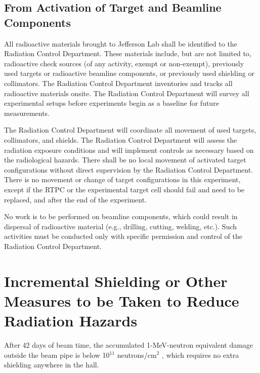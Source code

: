 \documentclass[12pt]{article}
\begin{document}
\subsection{From Activation of Target and Beamline Components}
All radioactive materials brought to Jefferson Lab shall be identified to the
Radiation Control Department. These materials include, but are not limited
to, radioactive check sources (of any activity, exempt or non-exempt), 
previously used targets or radioactive beamline components, or previously used
shielding or collimators. The Radiation Control Department inventories and
tracks all radioactive materials onsite. The Radiation Control Department
will survey all experimental setups before experiments begin as a baseline for
future measurements.

The Radiation Control Department will coordinate all movement of used
targets, collimators, and shields. The Radiation Control Department will
assess the radiation exposure conditions and will implement controls as 
necessary based on the radiological hazards.
There shall be no local movement of activated target configurations without 
direct supervision by the Radiation Control Department. There is no
movement or change of target configurations in this experiment, except if the
RTPC or the experimental target cell should fail and need to be replaced, and 
after the end of the experiment.

No work is to be performed on beamline components, which could result
in dispersal of radioactive material (e.g., drilling, cutting, welding, etc.).
Such activities must be conducted only with specific permission and control
of the Radiation Control Department.

\section{Incremental Shielding or Other Measures to be Taken to Reduce 
Radiation Hazards}
After 42 days of beam time, the accumulated 1-MeV-neutron equivalent
damage outside the beam pipe is below 10$^{11}$ neutrons/cm$^2$ , which 
requires no extra shielding anywhere in the hall.
\end{document}
